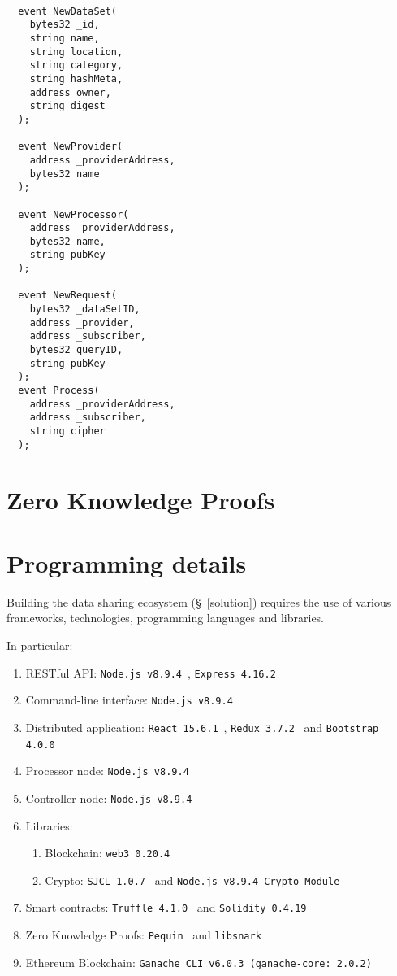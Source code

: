 \begin{lstlisting}[language=Solidity, caption={Data sharing application events}]

  event NewDataSet(
    bytes32 _id,
    string name,
    string location,
    string category,
    string hashMeta,
    address owner,
    string digest
  );

  event NewProvider(
    address _providerAddress,
    bytes32 name
  );

  event NewProcessor(
    address _providerAddress,
    bytes32 name,
    string pubKey
  );

  event NewRequest(
    bytes32 _dataSetID,
    address _provider,
    address _subscriber,
    bytes32 queryID,
    string pubKey
  );
  event Process(
    address _providerAddress,
    address _subscriber,
    string cipher
  );
\end{lstlisting}

\section{Zero Knowledge Proofs}
\label{implemenation:zkp}

\section{Programming details}
\label{implemenation:details}

Building the data sharing ecosystem (§~\ref{solution}) requires the use of various frameworks, technologies, programming languages and libraries.

In particular:

\begin{enumerate}
  \item RESTful API: \verb|Node.js v8.9.4|~\cite{nodejs}, \verb|Express 4.16.2|~\cite{expressjs}
  \item Command-line interface: \verb|Node.js v8.9.4|
  \item Distributed application: \verb|React 15.6.1|~\cite{react}, \verb|Redux 3.7.2|~\cite{redux} and \verb|Bootstrap 4.0.0|~\cite{bootstrap}
  \item Processor node: \verb|Node.js v8.9.4|
  \item Controller node: \verb|Node.js v8.9.4|
  \item Libraries:
    \begin{enumerate}
      \item Blockchain: \verb|web3 0.20.4|~\cite{web3js}
      \item Crypto: \verb|SJCL 1.0.7|~\cite{sjcl} and \verb|Node.js v8.9.4 Crypto Module|
    \end{enumerate}
  \item Smart contracts: \verb|Truffle 4.1.0|~\cite{truffle} and \verb|Solidity 0.4.19|~\cite{solidity}
  \item Zero Knowledge Proofs: \verb|Pequin|~\cite{pequin} and \verb|libsnark|~\cite{libsnark}
  \item Ethereum Blockchain: \verb|Ganache CLI v6.0.3 (ganache-core: 2.0.2)|~\cite{ganache}
\end{enumerate}

